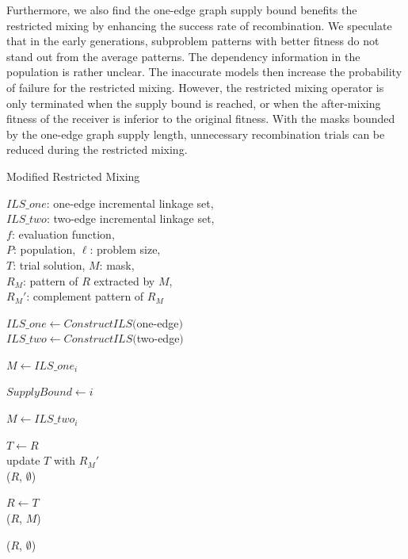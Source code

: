 Furthermore, we also find the one-edge graph supply bound benefits the restricted mixing by enhancing the success rate of recombination. We speculate that in the early generations, subproblem patterns with better fitness do not stand out from the average patterns. The dependency information in the population is rather unclear. The inaccurate models then increase the probability of failure for the restricted mixing. However, the restricted mixing operator is only terminated when the supply bound is reached, or when the after-mixing fitness of the receiver is inferior to the original fitness. With the masks bounded by the one-edge graph supply length, unnecessary recombination trials can be reduced during the restricted mixing. 



\begin{algorithm}[t!]
\caption{Modified Restricted Mixing}\label{algo_disjdecomp}

$ILS\_one$: one-edge incremental linkage set,\\
$ILS\_two$: two-edge incremental linkage set,\\
$f$: evaluation function, \\
$P$: population, $\ell$: problem size, \\
$T$: trial solution, $M$: mask, \\
${R_M}$: pattern of $R$ extracted by $M$, \\
${R_M}'$: complement pattern of ${R_M}$



\BlankLine
$ILS\_one  \leftarrow ConstructILS($one-edge$)$\\
$ILS\_two  \leftarrow ConstructILS($two-edge$)$
\BlankLine
{} {
    $M \leftarrow ILS\_one_i$ \\
     {
        $ SupplyBound \leftarrow i$
       
    }
}

\BlankLine
{} {

    $M \leftarrow ILS\_two_i$ \\

     {

        $T \leftarrow R$ \\
        update $T$ with ${R_M}'$ \\

         {
            \Return ($R$, $\emptyset$) 
        }

         {
            $R \leftarrow T$ \\
            \Return ($R$, $M$)
        }
    }
}
\Return ($R$, $\emptyset$) 
\end{algorithm}

